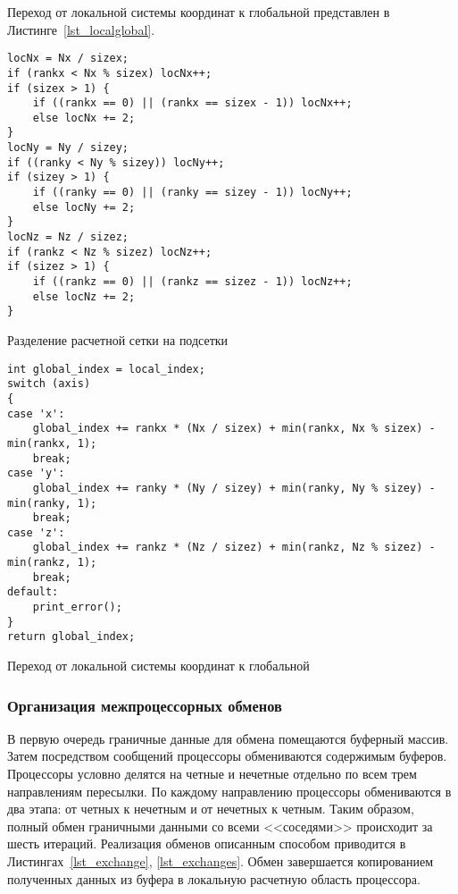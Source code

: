 Переход от локальной
системы координат к глобальной представлен в Листинге~\ref{lst_localglobal}.

\begin{listing}
\begin{verbatim}
locNx = Nx / sizex;
if (rankx < Nx % sizex) locNx++;
if (sizex > 1) {
    if ((rankx == 0) || (rankx == sizex - 1)) locNx++;
    else locNx += 2;
}
locNy = Ny / sizey;
if ((ranky < Ny % sizey)) locNy++;
if (sizey > 1) {
    if ((ranky == 0) || (ranky == sizey - 1)) locNy++;
    else locNy += 2;
}
locNz = Nz / sizez;
if (rankz < Nz % sizez) locNz++;
if (sizez > 1) {
    if ((rankz == 0) || (rankz == sizez - 1)) locNz++;
    else locNz += 2;
}
\end{verbatim}
\caption{Разделение расчетной сетки на подсетки}
\label{lst_globallocal}
\end{listing}

\begin{listing}
\begin{verbatim}
int global_index = local_index;
switch (axis)
{
case 'x':
    global_index += rankx * (Nx / sizex) + min(rankx, Nx % sizex) - min(rankx, 1);
    break;
case 'y':
    global_index += ranky * (Ny / sizey) + min(ranky, Ny % sizey) - min(ranky, 1);
    break;
case 'z':
    global_index += rankz * (Nz / sizez) + min(rankz, Nz % sizez) - min(rankz, 1);
    break;
default:
    print_error();
}
return global_index;
\end{verbatim}
\caption{Переход от локальной системы координат к глобальной}
\label{lst_localglobal}
\end{listing}

\subsubsection*{Организация межпроцессорных обменов}

В первую очередь граничные данные для обмена помещаются
буферный массив. Затем посредством сообщений процессоры
обмениваются содержимым буферов. Процессоры условно делятся
на четные и нечетные отдельно по всем трем направлениям пересылки.
По каждому направлению процессоры обмениваются в два этапа:
от четных к нечетным и от нечетных к четным. Таким образом,
полный обмен граничными данными со всеми <<соседями>> происходит
за шесть итераций. Реализация обменов описанным способом 
приводится в Листингах~\ref{lst_exchange}, \ref{lst_exchanges}. 
Обмен завершается копированием
полученных данных из буфера в локальную расчетную область процессора.

